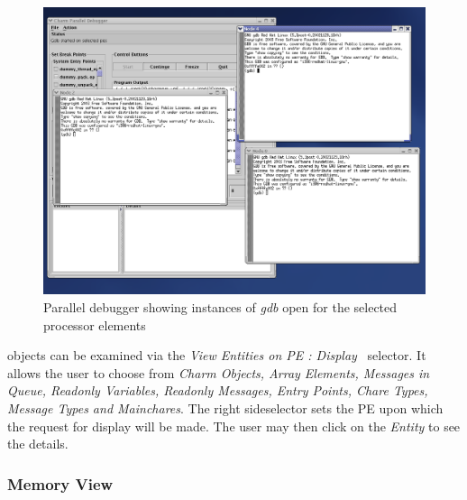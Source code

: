 \begin{figure}[ht!]
\centering
\includegraphics[width=6in]{figs/snapshot4-crop}
\caption{Parallel debugger showing instances of \textit{gdb}
open for the selected processor elements}
\label{gdb}
\end{figure}

\charmpp{} objects can be examined via  the \textit{View Entities on PE : Display} \ selector.  It allows the user to choose from  \textit{Charm Objects, Array Elements, Messages in Queue, Readonly Variables, Readonly Messages, Entry Points, Chare Types, Message Types and Mainchares}.  The right sideselector sets the PE upon which the request for display will be made. The user may then click on the \textit{Entity} to see the details. 




\subsubsection{Memory View}
\label{sec:memory}

